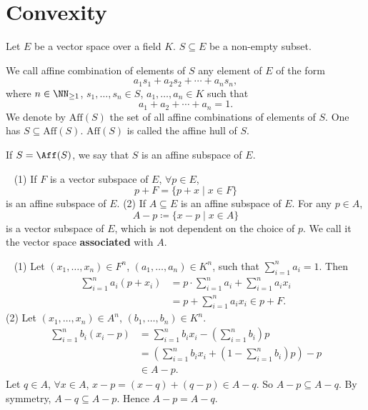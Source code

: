 \section{Convexity}
\begin{definitionenv}
    Let $E$ be a vector space over a field $K$. $S\subseteq E$ be a non-empty subset. 

    We call affine combination of elements of $S$ any element of $E$ of the form
    $$a_1s_1+a_2s_2+\cdots+a_ns_n,$$
    where $n\in\NN_{\ge1}$, $s_1,\ldots,s_n\in S$, $a_1,\ldots,a_n\in K$ such that
    $$a_1+a_2+\cdots+a_n=1.$$
    We denote by $\mathrm{Aff}(S)$ the set of all affine combinations of elements of $S$. One has $S\subseteq\mathrm{Aff}(S)$. $\mathrm{Aff}(S)$ is called the affine hull of $S$.

    If $S=\Aff(S)$, we say that $S$ is an affine subspace of $E$.
\end{definitionenv}
\begin{propositionenv}
    \ \newline
    (1) If $F$ is a vector subspace of $E$, $\forall p\in E$, $$p+F=\{p+x\mid x\in F\}$$ is an affine subspace of $E$.
    \newline
    (2) If $A\subseteq E$ is an affine subspace of $E$. For any $p\in A$, 
    $$A-p\coloneq \{x-p\mid x\in A\}$$
    is a vector subspace of $E$, which is not dependent on the choice of $p$. We call it the vector space \textbf{associated} with $A$.
\end{propositionenv}
\begin{proofenv}
    \ \newline
    (1) Let $(x_1,\ldots,x_n)\in F^n$, $(a_1,\ldots,a_n)\in K^n$, such that $\sum_{i=1}^n a_i=1$. Then
    \begin{align*}
        \sum_{i=1}^n a_i (p+x_i)&=p\cdot \sum_{i=1}^n a_i + \sum_{i=1}^n a_i x_i\\
        &=p+\sum_{i=1}^n a_i x_i\in p+F.
    \end{align*}
    (2) Let $(x_1,\ldots,x_n)\in A^n$, $(b_1,\ldots,b_n)\in K^n$.
    \begin{align*}
        \sum_{i=1}^n b_i (x_i - p)&=\sum_{i=1}^n b_i x_i - \left(\sum_{i=1}^n b_i\right) p\\
        &=\left(\sum_{i=1}^n b_i x_i+ \left(1-\sum_{i=1}^n b_i\right)p\right)   - p\\
        &\in A - p.
    \end{align*}
    Let $q\in A$, $\forall x\in A$, $x-p=(x-q)+(q-p)\in A-q$. So $A-p\subseteq A-q$. By symmetry, $A-q\subseteq A-p$. Hence $A-p=A-q$.
\end{proofenv}
